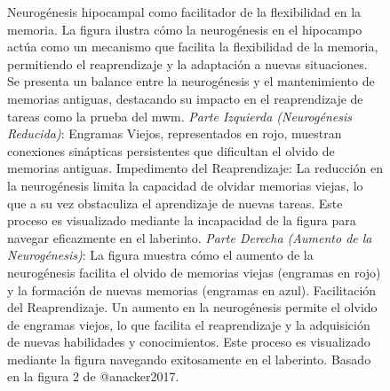 \documentclass[
  11pt]{../MastersDoctoralThesisUNAM}
\begin{document}
\begin{tcolorbox}[enhanced jigsaw, colframe=quarto-callout-important-color-frame, left=2mm, bottomrule=.15mm, rightrule=.15mm, arc=.35mm, toprule=.15mm, leftrule=.75mm, breakable, opacityback=0, colback=white]
\begin{figure}[H]


\caption[Neurogénesis y Flexibilidad en la
Memoria]{\label{fig-flexneuro}Neurogénesis hipocampal como facilitador
de la flexibilidad en la memoria. La figura ilustra cómo la neurogénesis
en el hipocampo actúa como un mecanismo que facilita la flexibilidad de
la memoria, permitiendo el reaprendizaje y la adaptación a nuevas
situaciones. Se presenta un balance entre la neurogénesis y el
mantenimiento de memorias antiguas, destacando su impacto en el
reaprendizaje de tareas como la prueba del \ac{mwm}. \emph{Parte
Izquierda (Neurogénesis Reducida)}: Engramas Viejos, representados en
rojo, muestran conexiones sinápticas persistentes que dificultan el
olvido de memorias antiguas. Impedimento del Reaprendizaje: La reducción
en la neurogénesis limita la capacidad de olvidar memorias viejas, lo
que a su vez obstaculiza el aprendizaje de nuevas tareas. Este proceso
es visualizado mediante la incapacidad de la figura para navegar
eficazmente en el laberinto. \emph{Parte Derecha (Aumento de la
Neurogénesis)}: La figura muestra cómo el aumento de la neurogénesis
facilita el olvido de memorias viejas (engramas en rojo) y la formación
de nuevas memorias (engramas en azul). Facilitación del Reaprendizaje.
Un aumento en la neurogénesis permite el olvido de engramas viejos, lo
que facilita el reaprendizaje y la adquisición de nuevas habilidades y
conocimientos. Este proceso es visualizado mediante la figura navegando
exitosamente en el laberinto. Basado en la figura 2 de @anacker2017.}

\end{figure}%


\end{tcolorbox}
\end{document}
